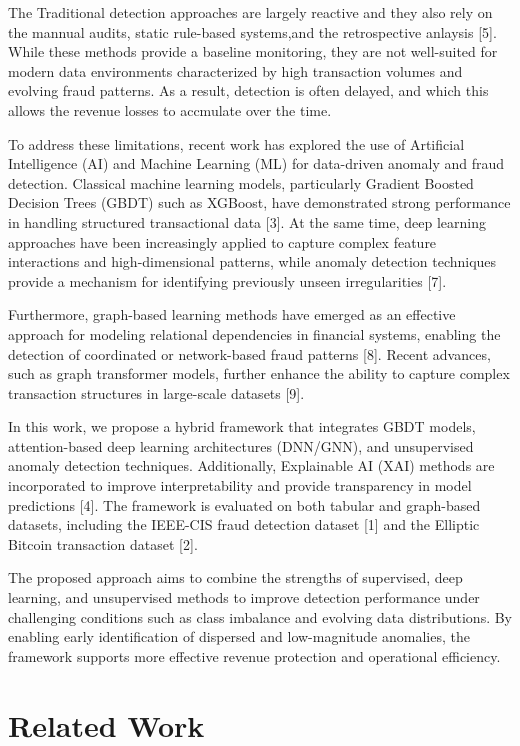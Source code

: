 \documentclass[conference]{IEEEtran}
\begin{document}
The Traditional detection approaches are largely reactive and they also rely on the mannual audits, static rule-based systems,and the retrospective anlaysis [5]. While these methods provide a baseline monitoring, they are not well-suited for modern data environments characterized by high transaction volumes and evolving fraud patterns. As a result, detection is often delayed, and which this allows the revenue losses to accmulate over the time.


To address these limitations, recent work has explored the use of Artificial Intelligence (AI) and Machine Learning (ML) for data-driven anomaly and fraud detection. Classical machine learning models, particularly Gradient Boosted Decision Trees (GBDT) such as XGBoost, have demonstrated strong performance in handling structured transactional data [3]. At the same time, deep learning approaches have been increasingly applied to capture complex feature interactions and high-dimensional patterns, while anomaly detection techniques provide a mechanism for identifying previously unseen irregularities [7].

Furthermore, graph-based learning methods have emerged as an effective approach for modeling relational dependencies in financial systems, enabling the detection of coordinated or network-based fraud patterns [8]. Recent advances, such as graph transformer models, further enhance the ability to capture complex transaction structures in large-scale datasets [9].

In this work, we propose a hybrid framework that integrates GBDT models, attention-based deep learning architectures (DNN/GNN), and unsupervised anomaly detection techniques. Additionally, Explainable AI (XAI) methods are incorporated to improve interpretability and provide transparency in model predictions [4]. The framework is evaluated on both tabular and graph-based datasets, including the IEEE-CIS fraud detection dataset [1] and the Elliptic Bitcoin transaction dataset [2].

The proposed approach aims to combine the strengths of supervised, deep learning, and unsupervised methods to improve detection performance under challenging conditions such as class imbalance and evolving data distributions. By enabling early identification of dispersed and low-magnitude anomalies, the framework supports more effective revenue protection and operational efficiency.


\section{Related Work}
\end{document}
